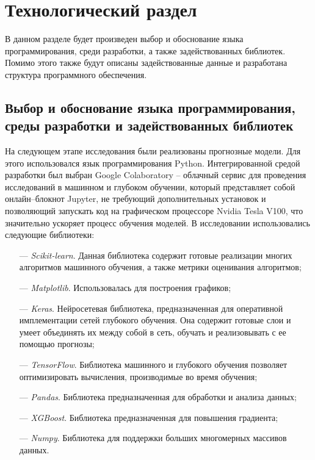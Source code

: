 \section{Технологический раздел}


\par В данном разделе будет произведен выбор и обоснование языка программирования, среди разработки, а также задействованных библиотек. Помимо этого также будут описаны задействованные данные и разработана структура программного обеспечения.


\subsection{Выбор и обоснование языка программирования, среды
разработки и задействованных библиотек}

\par На следующем этапе исследования были реализованы прогнозные модели. Для этого
использовался язык программирования Python. Интегрированной средой разработки был выбран Google Colaboratory – облачный сервис для проведения исследований в машинном и
глубоком обучении, который представляет собой онлайн–блокнот Jupyter, не требующий дополнительных установок и позволяющий запускать код на графическом процессоре Nvidia
Tesla V100, что значительно ускоряет процесс обучения моделей.
В исследовании использовались следующие библиотеки:

\begin{itemize}[leftmargin=1.6\parindent]
    \item[---] \textit{Scikit-learn}. Данная библиотека содержит готовые реализации многих алгоритмов машинного обучения, а также метрики оценивания алгоритмов;
	\item[---] \textit{Matplotlib}. Использовалась для построения графиков;
	\item[---] \textit{Keras}. Нейросетевая библиотека, предназначенная для оперативной имплементации сетей глубокого обучения. Она содержит готовые слои и умеет объединять их между собой в сеть, обучать и реализовывать с ее помощью прогнозы;
	\item[---] \textit{TensorFlow}. Библиотека машинного и глубокого обучения позволяет оптимизировать вычисления, производимые во время обучения;
	\item[---] \textit{Pandas}. Библиотека предназначенная для обработки и анализа данных;
	\item[---] \textit{XGBoost}. Библиотека предназначенная для повышения градиента;
	\item[---] \textit{Numpy}. Библиотека для поддержки больших многомерных массивов данных.
\end{itemize}

